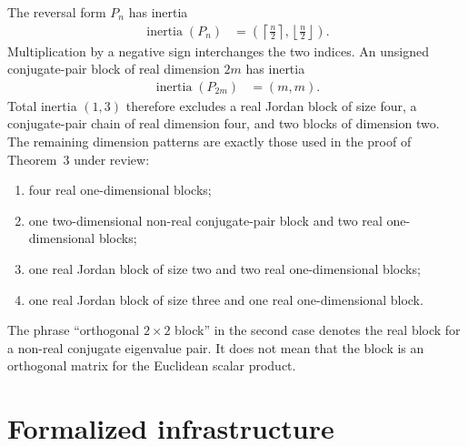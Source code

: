 \documentclass{article}
\begin{document}
The reversal form $P_n$ has inertia
\begin{align}
    \operatorname{inertia}(P_n)
        &=\left(\left\lceil\frac{n}{2}\right\rceil,
            \left\lfloor\frac{n}{2}\right\rfloor\right).
    \label{eq:qiclean_minkowski_canonical_pair_dependency_reversal_inertia}
\end{align}
Multiplication by a negative sign interchanges the two indices. An unsigned
conjugate-pair block of real dimension $2m$ has inertia
\begin{align}
    \operatorname{inertia}(P_{2m})
        &=(m,m).
    \label{eq:qiclean_minkowski_canonical_pair_dependency_complex_pair_inertia}
\end{align}
Total inertia $(1,3)$ therefore excludes a real Jordan block of size four, a
conjugate-pair chain of real dimension four, and two blocks of dimension two.
The remaining dimension patterns are exactly those used in the proof of
Theorem~3 under review:
\begin{enumerate}
    \item four real one-dimensional blocks;
    \item one two-dimensional non-real conjugate-pair block and two real
          one-dimensional blocks;
    \item one real Jordan block of size two and two real one-dimensional
          blocks;
    \item one real Jordan block of size three and one real one-dimensional
          block.
\end{enumerate}
The phrase ``orthogonal $2\times2$ block'' in the second case denotes the real
block for a non-real conjugate eigenvalue pair. It does not mean that the block
is an orthogonal matrix for the Euclidean scalar product.

\section{Formalized infrastructure}
\end{document}
